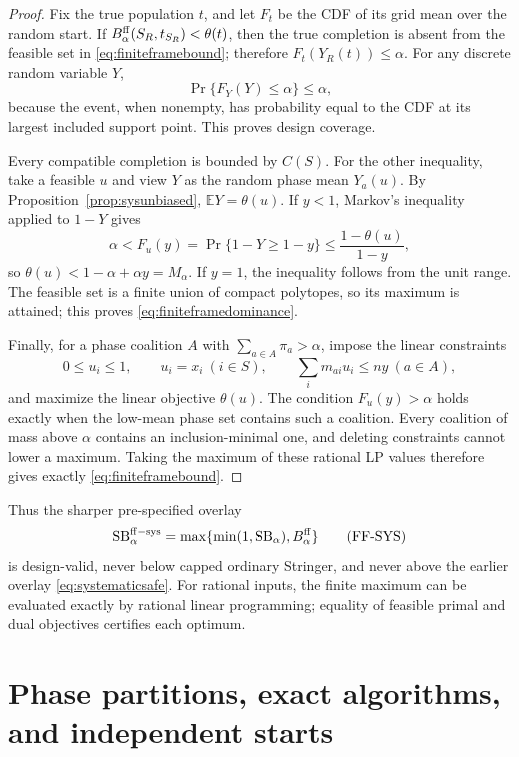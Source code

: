 \documentclass[11pt]{article}
\theoremstyle{definition}
\newcommand{\SB}{\mathrm{SB}}
\newcommand{\E}{\mathbb{E}}
\begin{document}
\begin{proof}
Fix the true population $t$, and let $F_t$ be the CDF of its grid mean over
the random start. If $B^{\rm ff}_\alpha(S_R,t_{S_R})<\theta(t)$, then the true
completion is absent from the feasible set in \eqref{eq:finiteframebound};
therefore $F_t(Y_R(t))\le\alpha$. For any discrete random variable $Y$,
\[
 \Pr\{F_Y(Y)\le\alpha\}\le\alpha,
\]
because the event, when nonempty, has probability equal to the CDF at its
largest included support point. This proves design coverage.

Every compatible completion is bounded by $C(S)$. For the other inequality,
take a feasible $u$ and view $Y$ as the random phase mean $Y_a(u)$. By
Proposition~\ref{prop:sysunbiased}, $\E Y=\theta(u)$. If $y<1$, Markov's
inequality applied to $1-Y$ gives
\[
 \alpha<F_u(y)=\Pr\{1-Y\ge1-y\}
 \le\frac{1-\theta(u)}{1-y},
\]
so $\theta(u)<1-\alpha+\alpha y=M_\alpha$. If $y=1$, the inequality follows
from the unit range. The feasible set is a finite union of compact polytopes,
so its maximum is attained; this proves \eqref{eq:finiteframedominance}.

Finally, for a phase coalition $A$ with
$\sum_{a\in A}\pi_a>\alpha$, impose the linear constraints
\[
 0\le u_i\le1,\qquad u_i=x_i\ (i\in S),\qquad
 \sum_i m_{ai}u_i\le ny\ (a\in A),
\]
and maximize the linear objective $\theta(u)$. The condition $F_u(y)>
\alpha$ holds exactly when the low-mean phase set contains such a coalition.
Every coalition of mass above $\alpha$ contains an inclusion-minimal one, and
deleting constraints cannot lower a maximum. Taking the maximum of these
rational LP values therefore gives exactly \eqref{eq:finiteframebound}.
\end{proof}

Thus the sharper pre-specified overlay
\begin{equation*}\label{eq:finiteframesafe}
 \SB_{\alpha}^{\rm ff-sys}
 =\max\{\min(1,\SB_\alpha),B^{\rm ff}_\alpha\}
\tag{FF-SYS}
\end{equation*}
is design-valid, never below capped ordinary Stringer, and never above the
earlier overlay \eqref{eq:systematicsafe}. For rational inputs, the finite maximum can be evaluated exactly by rational
linear programming; equality of feasible primal and dual objectives certifies
each optimum.

\section{Phase partitions, exact algorithms, and independent starts}
\label{sec:disjoint}
\end{document}
